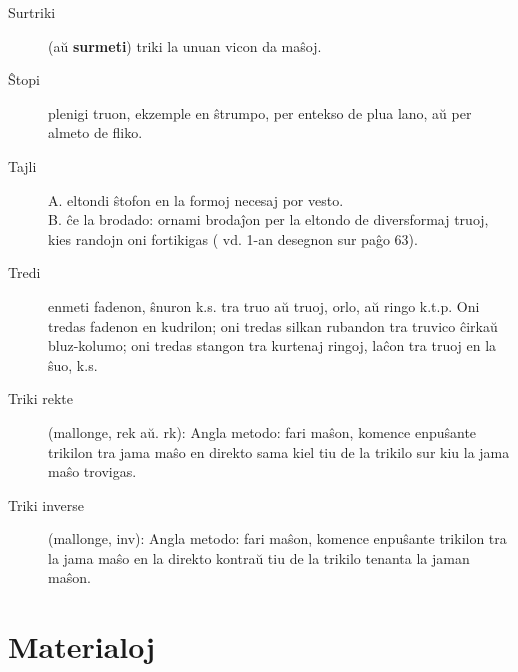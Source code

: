 \begin{description}
\item[Surtriki]

 (aŭ \textbf{surmeti}) triki la unuan vicon da maŝoj. 

\item[Ŝtopi]

 plenigi truon, ekzemple en ŝtrumpo, per entekso de plua lano, aŭ per almeto de fliko.

\item[Tajli]

 A. eltondi ŝtofon en la formoj necesaj por vesto.\\
B. ĉe la brodado: ornami brodaĵon per la eltondo de diversformaj truoj, kies randojn oni fortikigas ( vd. 1-an desegnon sur paĝo 63).

\item[Tredi]

 enmeti fadenon, ŝnuron k.s. tra truo aŭ truoj, orlo, aŭ ringo k.t.p. Oni tredas fadenon en kudrilon; oni tredas silkan rubandon tra truvico ĉirkaŭ bluz-kolumo; oni tredas stangon tra kurtenaj ringoj, laĉon tra truoj en la ŝuo, k.s.

\item[Triki rekte]

 (mallonge, rek aŭ. rk): Angla metodo: fari maŝon, komence enpuŝante trikilon tra jama maŝo en direkto sama kiel tiu de la trikilo sur kiu la jama maŝo trovigas. 

\item[Triki inverse]

 (mallonge, inv): Angla metodo: fari maŝon, komence enpuŝante trikilon tra la jama maŝo en la direkto kontraŭ tiu de la trikilo tenanta la jaman maŝon. 
\end{description}

\section[Materialoj]{Materialoj}
\hypertarget{Materialoj}{}
\label{Materialoj}


